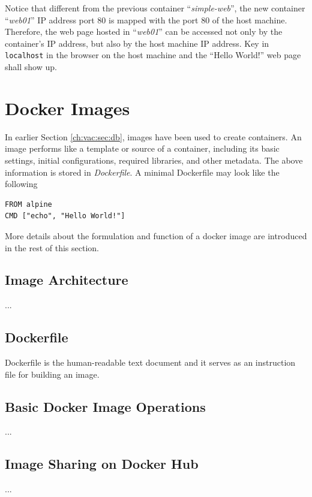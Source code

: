 Notice that different from the previous container ``\textit{simple-web}'', the new container ``\textit{web01}'' IP address port 80 is mapped with the port 80 of the host machine. Therefore, the web page hosted in ``\textit{web01}'' can be accessed not only by the container's IP address, but also by the host machine IP address. Key in \verb|localhost| in the browser on the host machine and the ``Hello World!'' web page shall show up.

\section{Docker Images}

In earlier Section \ref{ch:vac:sec:db}, images have been used to create containers. An image performs like a template or source of a container, including its basic settings, initial configurations, required libraries, and other metadata. The above information is stored in \textit{Dockerfile}. A minimal Dockerfile may look like the following
\begin{lstlisting}
FROM alpine
CMD ["echo", "Hello World!"]
\end{lstlisting}
More details about the formulation and function of a docker image are introduced in the rest of this section.

\subsection{Image Architecture}

...

\subsection{Dockerfile}

Dockerfile is the human-readable text document and it serves as an instruction file for building an image.

\subsection{Basic Docker Image Operations}

...

\subsection{Image Sharing on Docker Hub}


...
















